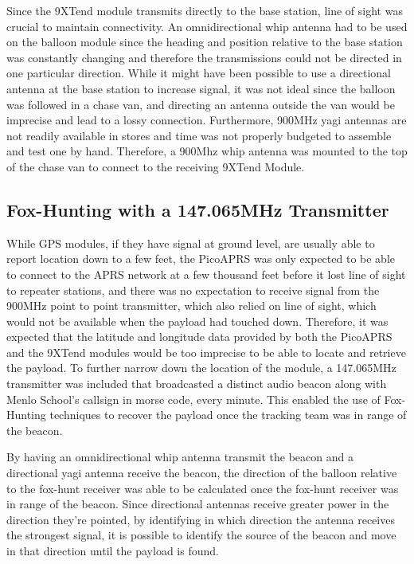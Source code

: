 \documentclass[12pt,]{article}
\begin{document}
Since the 9XTend module transmits directly to the base station, line of
sight was crucial to maintain connectivity. An omnidirectional whip
antenna had to be used on the balloon module since the heading and
position relative to the base station was constantly changing and
therefore the transmissions could not be directed in one particular
direction. While it might have been possible to use a directional
antenna at the base station to increase signal, it was not ideal since
the balloon was followed in a chase van, and directing an antenna
outside the van would be imprecise and lead to a lossy connection.
Furthermore, 900MHz yagi antennas are not readily available in stores
and time was not properly budgeted to assemble and test one by hand.
Therefore, a 900Mhz whip antenna was mounted to the top of the chase van
to connect to the receiving 9XTend Module.

\subsection{Fox-Hunting with a 147.065MHz
Transmitter}\label{fox-hunting-with-a-147.065mhz-transmitter}

While GPS modules, if they have signal at ground level, are usually able
to report location down to a few feet, the PicoAPRS was only expected to
be able to connect to the APRS network at a few thousand feet before it
lost line of sight to repeater stations, and there was no expectation to
receive signal from the 900MHz point to point transmitter, which also
relied on line of sight, which would not be available when the payload
had touched down. Therefore, it was expected that the latitude and
longitude data provided by both the PicoAPRS and the 9XTend modules
would be too imprecise to be able to locate and retrieve the payload. To
further narrow down the location of the module, a 147.065MHz transmitter
was included that broadcasted a distinct audio beacon along with Menlo
School's callsign in morse code, every minute. This enabled the use of
Fox-Hunting techniques to recover the payload once the tracking team was
in range of the beacon.

By having an omnidirectional whip antenna transmit the beacon and a
directional yagi antenna receive the beacon, the direction of the
balloon relative to the fox-hunt receiver was able to be calculated once
the fox-hunt receiver was in range of the beacon. Since directional
antennas receive greater power in the direction they're pointed, by
identifying in which direction the antenna receives the strongest
signal, it is possible to identify the source of the beacon and move in
that direction until the payload is found.
\end{document}
